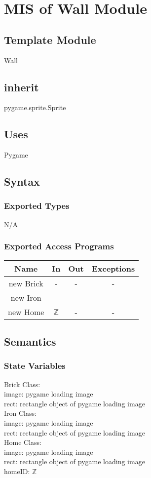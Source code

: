 \documentclass[12pt, titlepage]{article}
\begin{document}
\section{MIS of Wall Module}
        \subsection{Template Module}
        Wall
        \subsection{inherit}
        pygame.sprite.Sprite
        \subsection{Uses}
        Pygame
		\subsection{Syntax}
		\subsubsection{Exported Types}
		N/A
		\subsubsection{Exported Access Programs}
				\begin{tabular}[pos]{|c|c|c|c|}
					
					\hline
					\textbf{Name}& \textbf{In} & \textbf{Out} & \textbf{Exceptions} \\ \hline
					new Brick & - & - & - \\ \hline
					new Iron & - & - & - \\ \hline
					new Home & $\mathbb{Z}$ & - & - \\ \hline
			    \end{tabular}
		
		\subsection{Semantics}
		\subsubsection{State Variables}
		Brick Class:\\
		image: pygame loading image\\
		rect: rectangle object of pygame loading image\\
		Iron Class:\\
		image: pygame loading image\\
		rect: rectangle object of pygame loading image\\
		Home Class:\\
		image: pygame loading image\\
		rect: rectangle object of pygame loading image\\
        homeID: $\mathbb{Z}$\\
		
\end{document}
